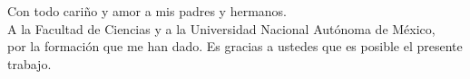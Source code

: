 \begin{dedication}

Con todo cariño y amor a mis padres y hermanos.\\
A la Facultad de Ciencias y a la Universidad Nacional Autónoma de México,\\
por la formación que me han dado. Es gracias a ustedes que es posible el presente trabajo.\\

\end{dedication}
